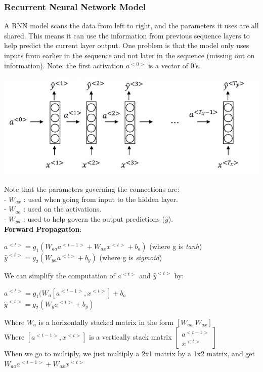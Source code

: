 \documentclass[11pt, a4paper]{article}
\begin{document}
\begin{spacing}{1.1}
	\subsubsection{Recurrent Neural Network Model}
	A RNN model scans the data from left to right, and the parameters it uses are all shared. This means it can use the information from previous sequence layers to help predict the current layer output. One problem is that the model only uses inputs from earlier in the sequence and not later in the sequence (missing out on information). Note: the first activation $a^{<0>}$ is a vector of 0's.
	\begin{center}
	\includegraphics[scale=.6]{rnn}
	\end{center}
	Note that the parameters governing the connections are: \\
	- $W_{ax}$ : used when going from input to the hidden layer. \\
	- $W_{aa}$ : used on the activations. \\
	- $W_{ya}$ : used to help govern the output predictions ($\hat{y}$). \vspace*{2mm}\\
	\textbf{Forward Propagation}:
	\begin{center}
	$ a^{<t>} = g_1(W_{aa} a^{<t-1>} + W_{ax} x^{<t>} + b_a)$ (where g is \textit{tanh}) \vspace*{.5mm}\\
	$ \hat{y}^{<t>} = g_2(W_{ya} a^{<t>} + b_y)$ (where g is \textit{sigmoid})
	\end{center}
	We can simplify the computation of $a^{<t>}$ and $\hat{y}^{<t>}$  by: 
	\begin{center}
	$ a^{<t>} = g_1(W_{a}[a^{<t-1>}, x^{<t>}] + b_a$ \\
	$ \hat{y}^{<t>} = g_2(W_{y} a^{<t>} + b_y)$
	\end{center}
	Where $W_a$ is a horizontally stacked matrix in the form $[W_{aa} \; W_{ax}]$  \vspace*{1mm}\\
	Where $[a^{<t-1>}, x^{<t>}]$ is a vertically stack matrix $\begin{bmatrix} a^{<t-1>} \\ x^{<t>} \end{bmatrix}$ \\
	When we go to multiply, we just multiply a 2x1 matrix by a 1x2 matrix, and get $W_{aa} a^{<t-1>} + W_{ax} x^{<t>}$ \newpage


\end{spacing}
\end{document}
